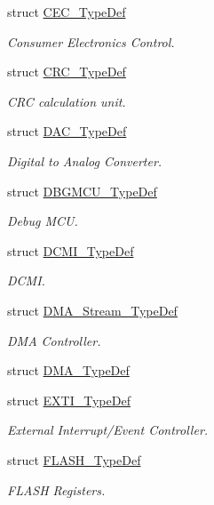\begin{DoxyCompactItemize}
struct \mbox{\hyperlink{struct_c_e_c___type_def}{C\+E\+C\+\_\+\+Type\+Def}}
\begin{DoxyCompactList}\small\item\em Consumer Electronics Control. \end{DoxyCompactList}\item 
struct \mbox{\hyperlink{struct_c_r_c___type_def}{C\+R\+C\+\_\+\+Type\+Def}}
\begin{DoxyCompactList}\small\item\em C\+RC calculation unit. \end{DoxyCompactList}\item 
struct \mbox{\hyperlink{struct_d_a_c___type_def}{D\+A\+C\+\_\+\+Type\+Def}}
\begin{DoxyCompactList}\small\item\em Digital to Analog Converter. \end{DoxyCompactList}\item 
struct \mbox{\hyperlink{struct_d_b_g_m_c_u___type_def}{D\+B\+G\+M\+C\+U\+\_\+\+Type\+Def}}
\begin{DoxyCompactList}\small\item\em Debug M\+CU. \end{DoxyCompactList}\item 
struct \mbox{\hyperlink{struct_d_c_m_i___type_def}{D\+C\+M\+I\+\_\+\+Type\+Def}}
\begin{DoxyCompactList}\small\item\em D\+C\+MI. \end{DoxyCompactList}\item 
struct \mbox{\hyperlink{struct_d_m_a___stream___type_def}{D\+M\+A\+\_\+\+Stream\+\_\+\+Type\+Def}}
\begin{DoxyCompactList}\small\item\em D\+MA Controller. \end{DoxyCompactList}\item 
struct \mbox{\hyperlink{struct_d_m_a___type_def}{D\+M\+A\+\_\+\+Type\+Def}}
\item 
struct \mbox{\hyperlink{struct_e_x_t_i___type_def}{E\+X\+T\+I\+\_\+\+Type\+Def}}
\begin{DoxyCompactList}\small\item\em External Interrupt/\+Event Controller. \end{DoxyCompactList}\item 
struct \mbox{\hyperlink{struct_f_l_a_s_h___type_def}{F\+L\+A\+S\+H\+\_\+\+Type\+Def}}
\begin{DoxyCompactList}\small\item\em F\+L\+A\+SH Registers. \end{DoxyCompactList}\item 

\end{DoxyCompactItemize}
